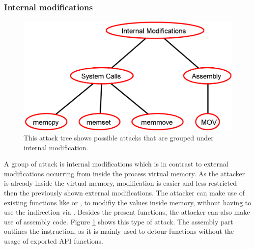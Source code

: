 \subsubsection{Internal modifications}
\label{sec:internal_modifications}
\begin{figure}[h]
\centering
\includegraphics[scale=0.45]{sections/adtrees/InternalModificationsWithoutDefenses.png}
\caption{This attack tree shows possible attacks that are grouped under internal modification.}
\label{fig:attacks_internal}
\end{figure}
A group of attack is internal modifications which is in contrast to external modifications occurring from inside the process virtual memory. As the attacker is already inside the virtual memory, modification is easier and less restricted then the previously shown external modifications. The attacker can make use of existing functions like  or , to modifiy the values inside memory, without having to use the indirection via . Besides the present  functions, the attacker can also make use of assembly code. Figure \ref{fig:attacks_internal} shows this type of attack. The assembly part outlines the  instruction, as it is mainly used to detour functions without the usage of exported API functions.